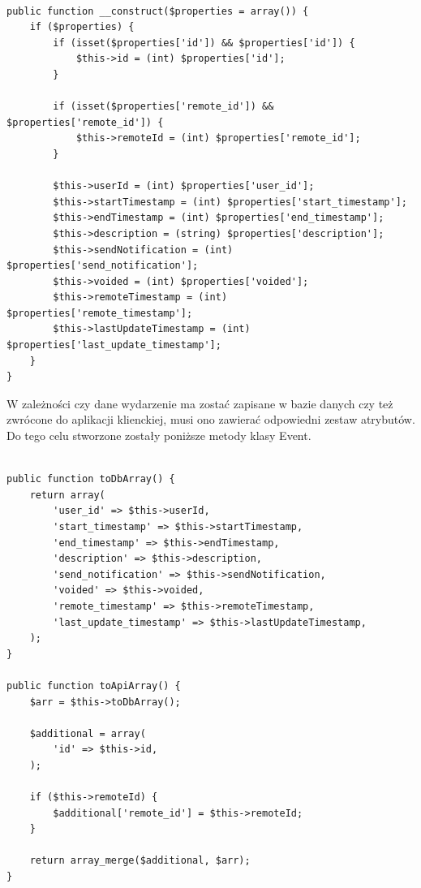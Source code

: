 

\begin{lstlisting}[caption=Fragment konstruktora klasy Event., label=amb, captionpos=b]

public function __construct($properties = array()) {
    if ($properties) {
        if (isset($properties['id']) && $properties['id']) {
            $this->id = (int) $properties['id'];
        }

        if (isset($properties['remote_id']) && $properties['remote_id']) {
            $this->remoteId = (int) $properties['remote_id'];
        }

        $this->userId = (int) $properties['user_id'];
        $this->startTimestamp = (int) $properties['start_timestamp'];
        $this->endTimestamp = (int) $properties['end_timestamp'];
        $this->description = (string) $properties['description'];
        $this->sendNotification = (int) $properties['send_notification'];
        $this->voided = (int) $properties['voided'];
        $this->remoteTimestamp = (int) $properties['remote_timestamp'];
        $this->lastUpdateTimestamp = (int) $properties['last_update_timestamp'];
    }
}

\end{lstlisting}

W zależności czy dane wydarzenie ma zostać zapisane w bazie danych czy też zwrócone do aplikacji klienckiej, musi ono zawierać odpowiedni zestaw atrybutów. Do tego celu stworzone zostały poniższe metody klasy Event.

\begin{lstlisting}[caption=Serializacja obiektu Event., label=amb, captionpos=b]

public function toDbArray() {
    return array(
        'user_id' => $this->userId,
        'start_timestamp' => $this->startTimestamp,
        'end_timestamp' => $this->endTimestamp,
        'description' => $this->description,
        'send_notification' => $this->sendNotification,
        'voided' => $this->voided,
        'remote_timestamp' => $this->remoteTimestamp,
        'last_update_timestamp' => $this->lastUpdateTimestamp,
    );
}

public function toApiArray() {
    $arr = $this->toDbArray();

    $additional = array(
    	'id' => $this->id,
    );

    if ($this->remoteId) {
    	$additional['remote_id'] = $this->remoteId;
    }

    return array_merge($additional, $arr);
}

\end{lstlisting}

